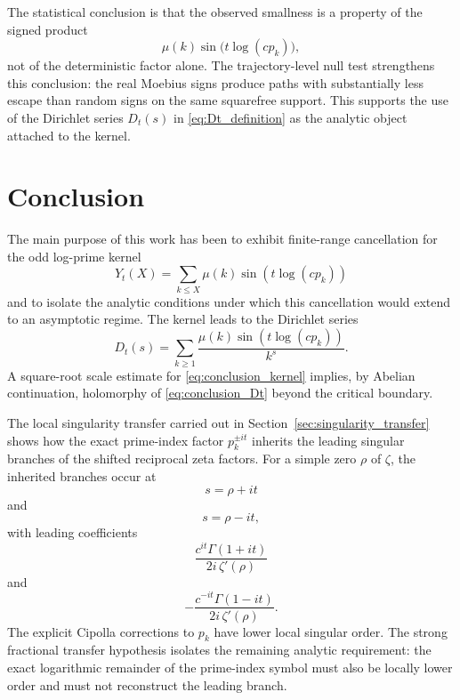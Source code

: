 \documentclass[11pt]{amsart}
\numberwithin{equation}{section}
\theoremstyle{plain}
\theoremstyle{definition}
\theoremstyle{remark}
\begin{document}
The statistical conclusion is that the observed smallness is a property of
the signed product
\begin{equation}
\mu(k)\sin\bigl(t\log(c p_k)\bigr),
\label{eq:signed_product_conclusion}
\end{equation}
not of the deterministic factor alone.  The trajectory-level null test
strengthens this conclusion: the real Moebius signs produce paths with
substantially less escape than random signs on the same squarefree support.
This supports the use of the Dirichlet series $D_t(s)$ in
\eqref{eq:Dt_definition} as the analytic object attached to the kernel.

\section{Conclusion}
\label{sec:conclusion}

The main purpose of this work has been to exhibit finite-range cancellation
for the odd log-prime kernel
\begin{equation}
Y_t(X)=\sum_{k\le X}\mu(k)\sin(t\log(c p_k))
\label{eq:conclusion_kernel}
\end{equation}
and to isolate the analytic conditions under which this cancellation would
extend to an asymptotic regime.  The kernel leads to the Dirichlet series
\begin{equation}
D_t(s)=\sum_{k\ge1}\frac{\mu(k)\sin(t\log(c p_k))}{k^s}.
\label{eq:conclusion_Dt}
\end{equation}
A square-root scale estimate for \eqref{eq:conclusion_kernel} implies, by
Abelian continuation, holomorphy of \eqref{eq:conclusion_Dt} beyond the
critical boundary.

The local singularity transfer carried out in Section~\ref{sec:singularity_transfer}
shows how the exact prime-index factor $p_k^{\pm it}$ inherits the leading
singular branches of the shifted reciprocal zeta factors.  For a simple
zero $\rho$ of $\zeta$, the inherited branches occur at
\begin{equation}
s=\rho+it
\label{eq:conclusion_plus_branch_location}
\end{equation}
and
\begin{equation}
s=\rho-it,
\label{eq:conclusion_minus_branch_location}
\end{equation}
with leading coefficients
\begin{equation}
\frac{c^{it}\Gamma(1+it)}{2i\,\zeta'(\rho)}
\label{eq:conclusion_plus_branch_coefficient}
\end{equation}
and
\begin{equation}
-\frac{c^{-it}\Gamma(1-it)}{2i\,\zeta'(\rho)}.
\label{eq:conclusion_minus_branch_coefficient}
\end{equation}
The explicit Cipolla corrections to $p_k$ have lower local singular order.
The strong fractional transfer hypothesis isolates the remaining analytic
requirement: the exact logarithmic remainder of the prime-index symbol must
also be locally lower order and must not reconstruct the leading branch.
\end{document}
